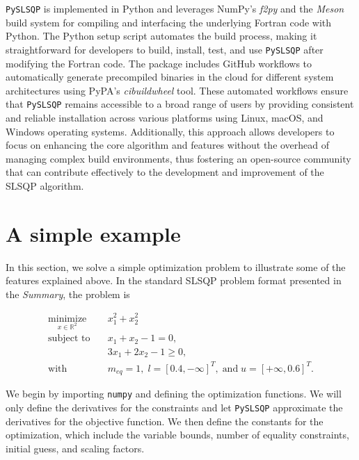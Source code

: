 \documentclass[
]{article}
\begin{document}
\texttt{PySLSQP} is implemented in Python and leverages NumPy's
\emph{f2py} and the \emph{Meson} build system for compiling and
interfacing the underlying Fortran code with Python. The Python setup
script automates the build process, making it straightforward for
developers to build, install, test, and use \texttt{PySLSQP} after
modifying the Fortran code. The package includes GitHub workflows to
automatically generate precompiled binaries in the cloud for different
system architectures using PyPA's \emph{cibuildwheel} tool. These
automated workflows ensure that \texttt{PySLSQP} remains accessible to a
broad range of users by providing consistent and reliable installation
across various platforms using Linux, macOS, and Windows operating
systems. Additionally, this approach allows developers to focus on
enhancing the core algorithm and features without the overhead of
managing complex build environments, thus fostering an open-source
community that can contribute effectively to the development and
improvement of the SLSQP algorithm.

\section{A simple example}\label{a-simple-example}

In this section, we solve a simple optimization problem to illustrate
some of the features explained above. In the standard SLSQP problem
format presented in the \emph{Summary}, the problem is

\begin{align*}
\underset{x \in \mathbb{R}^2}{\text{minimize}} \quad & x_1^2 + x_2^2\\
\text{subject to} \quad & x_1 + x_2 - 1 = 0, \\
& 3x_1 + 2x_2 - 1 \geq 0,  \\
\text{with} \quad & m_{eq} = 1, \; l = [0.4, -\infty]^T, \; \text{and} \; u = [+\infty, 0.6]^T.
\end{align*}

We begin by importing \texttt{numpy} and defining the optimization
functions. We will only define the derivatives for the constraints and
let \texttt{PySLSQP} approximate the derivatives for the objective
function. We then define the constants for the optimization, which
include the variable bounds, number of equality constraints, initial
guess, and scaling factors.
\end{document}
